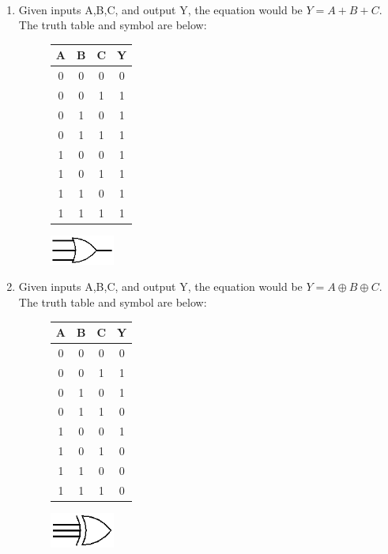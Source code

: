 \documentclass[12pt]{article}
\newenvironment{sol}[1][Solution]{\begin{trivlist}
		\item[\hskip \labelsep {\bfseries #1:}]}{\end{trivlist}}
\begin{document}
\begin{sol}\
	\begin{enumerate}[label=(\alph*)]
		\item Given inputs A,B,C, and output Y, the equation would be $Y=A+B+C$. The truth table and symbol are below:
		\begin{figure}[h]
			\centering
			\begin{tabular}{|ccc|c|}
				\hline
				A & B & C & Y \\
				\hline
				0 & 0 & 0 & 0 \\
				0 & 0 & 1 & 1 \\
				0 & 1 & 0 & 1 \\
				0 & 1 & 1 & 1 \\
				1 & 0 & 0 & 1 \\
				1 & 0 & 1 & 1 \\
				1 & 1 & 0 & 1 \\
				1 & 1 & 1 & 1 \\
				\hline
			\end{tabular}
			\quad\quad
			\includegraphics[width=0.2\textwidth]{or-gate-3-inputs}
		\end{figure}
		\item Given inputs A,B,C, and output Y, the equation would be $Y=A\oplus B\oplus C$. The truth table and symbol are below:
		\begin{figure}[h]
			\centering
			\begin{tabular}{|ccc|c|}
				\hline
				A & B & C & Y \\
				\hline
				0 & 0 & 0 & 0 \\
				0 & 0 & 1 & 1 \\
				0 & 1 & 0 & 1 \\
				0 & 1 & 1 & 0 \\
				1 & 0 & 0 & 1 \\
				1 & 0 & 1 & 0 \\
				1 & 1 & 0 & 0 \\
				1 & 1 & 1 & 0 \\
				\hline
			\end{tabular}
			\quad\quad
			\includegraphics[width=0.2\textwidth]{xor-gate-3-inputs}
		\end{figure}

\end{enumerate}
\end{sol}
\end{document}

